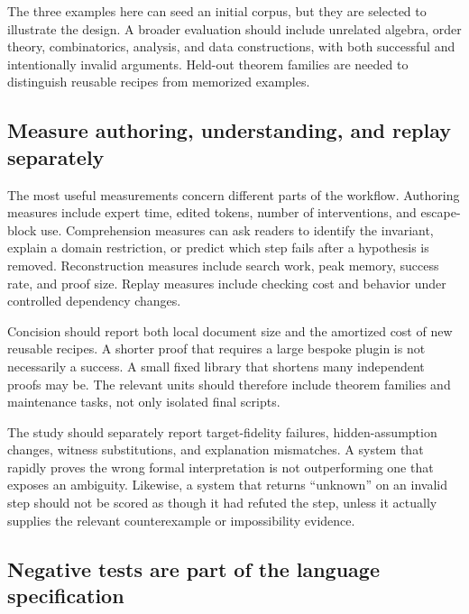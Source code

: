 \documentclass[11pt,letterpaper]{article}
\theoremstyle{remark}
\begin{document}
The three examples here can seed an initial corpus, but they are selected to illustrate the design. A broader evaluation should include unrelated algebra, order theory, combinatorics, analysis, and data constructions, with both successful and intentionally invalid arguments. Held-out theorem families are needed to distinguish reusable recipes from memorized examples.

\subsection{Measure authoring, understanding, and replay separately}

The most useful measurements concern different parts of the workflow. Authoring measures include expert time, edited tokens, number of interventions, and escape-block use. Comprehension measures can ask readers to identify the invariant, explain a domain restriction, or predict which step fails after a hypothesis is removed. Reconstruction measures include search work, peak memory, success rate, and proof size. Replay measures include checking cost and behavior under controlled dependency changes.

Concision should report both local document size and the amortized cost of new reusable recipes. A shorter proof that requires a large bespoke plugin is not necessarily a success. A small fixed library that shortens many independent proofs may be. The relevant units should therefore include theorem families and maintenance tasks, not only isolated final scripts.

The study should separately report target-fidelity failures, hidden-assumption changes, witness substitutions, and explanation mismatches. A system that rapidly proves the wrong formal interpretation is not outperforming one that exposes an ambiguity. Likewise, a system that returns ``unknown'' on an invalid step should not be scored as though it had refuted the step, unless it actually supplies the relevant counterexample or impossibility evidence.

\subsection{Negative tests are part of the language specification}
\end{document}
